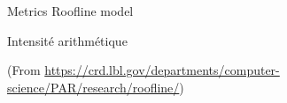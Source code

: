 %
\begin{Frame}{Metrics Roofline model}
      \begin{block}{Intensité arithmétique}
      \end{block}   
 (From \url{https://crd.lbl.gov/departments/computer-science/PAR/research/roofline/})
\end{Frame}


